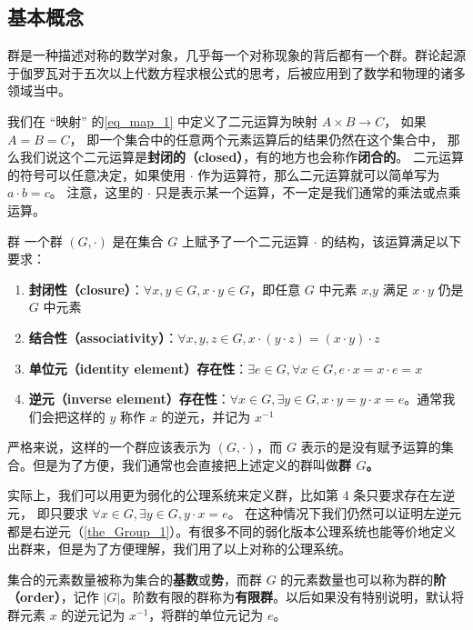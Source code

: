 

\subsection{基本概念}
群是一种描述对称的数学对象，几乎每一个对称现象的背后都有一个群。群论起源于伽罗瓦对于五次以上代数方程求根公式的思考，后被应用到了数学和物理的诸多领域当中。

我们在 “映射” 的\autoref{eq_map_1} 中定义了二元运算为映射 $A \times B \to C$， 如果 $A = B = C$， 即一个集合中的任意两个元素运算后的结果仍然在这个集合中， 那么我们说这个二元运算是\textbf{封闭的（closed）}，有的地方也会称作\textbf{闭合的}。 二元运算的符号可以任意决定，如果使用 $\cdot$ 作为运算符，那么二元运算就可以简单写为 $a \cdot b=c$。 注意，这里的 $\cdot$ 只是表示某一个运算，不一定是我们通常的乘法或点乘运算。

\begin{definition}{群}\label{def_Group_1}
一个群 $(G, \cdot)$ 是在集合 $G$ 上赋予了一个二元运算 $\cdot$ 的结构，该运算满足以下要求：
\begin{enumerate}
\item \textbf{封闭性（closure）}：$\forall x, y\in G, x\cdot y\in G$，即任意 $G$ 中元素 $x$,$y$ 满足 $x\cdot y$ 仍是 $G$ 中元素
\item \textbf{结合性（associativity）}：$\forall x, y, z\in G, x\cdot(y\cdot z)=(x\cdot y)\cdot z$
\item \textbf{单位元（identity element）存在性}：$\exists e\in G, \forall x\in G, e\cdot x=x\cdot e=x$
\item \textbf{逆元（inverse element）存在性}：$\forall x\in G, \exists y\in G, x\cdot y=y\cdot x=e$。通常我们会把这样的 $y$ 称作 $x$ 的逆元，并记为 $x^{-1}$
\end{enumerate}
\end{definition}
严格来说，这样的一个群应该表示为 $(G,\cdot)$，而 $G$ 表示的是没有赋予运算的集合。但是为了方便，我们通常也会直接把上述定义的群叫做\textbf{群 $G$。}

实际上，我们可以用更为弱化的公理系统来定义群，比如第 4 条只要求存在左逆元， 即只要求 $\forall x\in G, \exists y\in G, y\cdot x=e$。 在这种情况下我们仍然可以证明左逆元都是右逆元（\autoref{the_Group_1}）。有很多不同的弱化版本公理系统也能等价地定义出群来，但是为了方便理解，我们用了以上对称的公理系统。

集合的元素数量被称为集合的\textbf{基数}或\textbf{势}，而群 $G$ 的元素数量也可以称为群的\textbf{阶（order）}，记作 $|G|$。阶数有限的群称为\textbf{有限群}。以后如果没有特别说明，默认将群元素 $x$ 的逆元记为 $x^{-1}$，将群的单位元记为 $e$。

